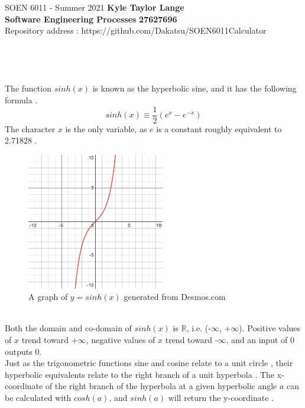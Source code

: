 \documentclass[letterpaper, 11pt]{report}
\begin{document}
\section*{}
\normalsize {SOEN 6011 - Summer 2021} \hfill \textbf{Kyle Taylor Lange} \\
\textbf{ Software Engineering Processes}  \hfill \textbf{27627696} \\
\hfill Repository address : https://github.com/Dakatsu/SOEN6011Calculator
\\\\\\\\\\
\normalsize{The function $sinh(x)$ is known as the hyperbolic sine, and it has the following formula \cite{sinh}. 
$$sinh(x) \equiv \frac{1}{2}(e^x-e^{-x})$$
The character $x$ is the only variable, as $e$ is a constant roughly equivalent to 2.71828 \cite{e}.}
\\
\begin{figure}[sinh]
 \centering
 \includegraphics[width= 6cm]{SOEN_6011-Problem-1/images/desmos-graph-f3.png}
  \caption{A graph of $y = sinh(x)$ generated from Desmos.com}
\end{figure}
\\
\normalsize{Both the domain and co-domain of $sinh(x)$ is $\mathbb{R}$, i.e. (-$\infty$, +$\infty$). Positive values of $x$ trend toward +$\infty$, negative values of $x$ trend toward -$\infty$, and an input of 0 outputs 0.
\\Just as the trigonometric functions sine and cosine relate to a unit circle \cite{circular}, their hyperbolic equivalents relate to the right branch of a unit hyperbola \cite{hyperbolic}. The x-coordinate of the right branch of the hyperbola at a given hyperbolic angle $a$ can be calculated with $cosh(a)$, and $sinh(a)$ will return the y-coordinate \cite{rectHyperbola}.}
\end{document}
